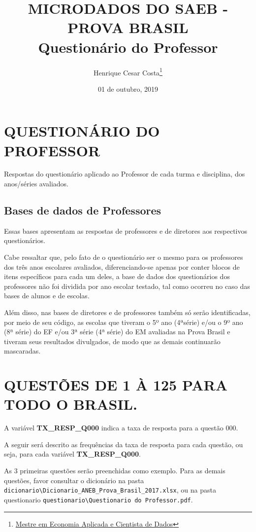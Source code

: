\documentclass[]{article}
\title{MICRODADOS DO SAEB - PROVA BRASIL\\
Questionário do Professor}
\author{Henrique Cesar Costa\footnote{\href{https://about.me/henriquecosta}{Mestre
  em Economia Aplicada e Cientista de Dados}}}
\date{01 de outubro, 2019}
\begin{document}
\maketitle

\hypertarget{questionario-do-professor}{%
\section{QUESTIONÁRIO DO PROFESSOR}\label{questionario-do-professor}}

Respostas do questionário aplicado ao Professor de cada turma e
disciplina, dos anos/séries avaliados.

\hypertarget{bases-de-dados-de-professores}{%
\subsection{Bases de dados de
Professores}\label{bases-de-dados-de-professores}}

Essas bases apresentam as respostas de professores e de diretores aos
respectivos questionários.

Cabe ressaltar que, pelo fato de o questionário ser o mesmo para os
professores dos três anos escolares avaliados, diferenciando-se apenas
por conter blocos de itens específicos para cada um deles, a base de
dados dos questionários dos professores não foi dividida por ano escolar
testado, tal como ocorreu no caso das bases de alunos e de escolas.

Além disso, nas bases de diretores e de professores também só serão
identificadas, por meio de seu código, as escolas que tiveram o 5º ano
(4ªsérie) e/ou o 9º ano (8ª série) do EF e/ou 3ª série (4ª série) do EM
avaliadas na Prova Brasil e tiveram seus resultados divulgados, de modo
que as demais continuarão mascaradas.

\hypertarget{questoes-de-1-a-125-para-todo-o-brasil.}{%
\section{QUESTÕES DE 1 À 125 PARA TODO O
BRASIL.}\label{questoes-de-1-a-125-para-todo-o-brasil.}}

A variável \textbf{TX\_RESP\_Q000} indica a taxa de resposta para a
questão 000.

A seguir será descrito as frequências da taxa de resposta para cada
questão, ou seja, para cada variável \textbf{TX\_RESP\_Q000}.

As 3 primeiras questões serão preenchidas como exemplo. Para as demais
questões, favor consultar o dicionário na pasta
\texttt{dicionario\textbackslash{}Dicionario\_ANEB\_Prova\_Brasil\_2017.xlsx},
ou na pasta questionario
\texttt{questionario\textbackslash{}Questionario\ do\ Professor.pdf}.
\end{document}
